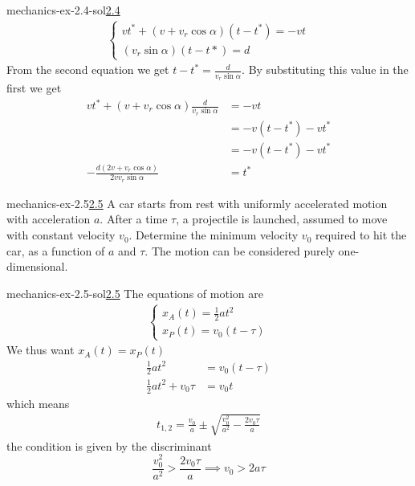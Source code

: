 \documentclass[preview]{standalone}
\begin{document}
\begin{snippetsolution}{mechanics-ex-2.4-sol}{\underline{2.4}}
\begin{align*}
\begin{cases}
            vt^* + (v+v_r \cos \alpha)(t-t^*) = -vt \\
            (v_r \sin \alpha)(t-t*) = d
        \end{cases}
    \end{align*}
    From the second equation we get \(t-t^* = \frac{d}{v_r \sin \alpha}\).
    By substituting this value in the first we get
    \begin{align*}
        vt^* + (v + v_r \cos\alpha) \frac{d}{v_r \sin\alpha} &= -vt \\
         &= -v(t-t^*) - vt^* \\
         &= -v(t-t^*) - vt^* \\
         -\frac{d(2v + v_r\cos\alpha)}{2vv_r\sin\alpha} &= t^*
    \end{align*}
\end{snippetsolution}

\begin{snippetexercise}{mechanics-ex-2.5}{\underline{2.5}}
    A car starts from rest with uniformly accelerated motion with acceleration \(a\).
    After a time \(\tau\), a projectile is launched, assumed to move with constant velocity \(v_0\).
    Determine the minimum velocity \(v_0\) required to hit the car, as a function of \(a\) and \(\tau\).
    The motion can be considered purely one-dimensional.
\end{snippetexercise}

\begin{snippetsolution}{mechanics-ex-2.5-sol}{\underline{2.5}}
    The equations of motion are
    \begin{align*}
        \begin{cases}
            x_A(t) = \frac{1}{2}at^2 \\
            x_P(t) = v_0(t-\tau)
        \end{cases}
    \end{align*}
    We thus want \(x_A(t) = x_P(t)\)
    \begin{align*}
        \frac{1}{2}at^2 &= v_0(t-\tau) \\
        \frac{1}{2}at^2 + v_0\tau &= v_0t
    \end{align*}
    which means
    \begin{align*}
        t_{1,2} = \frac{v_0}{a} \pm \sqrt{\frac{v_0^2}{a^2} - \frac{2v_0\tau}{a}}
    \end{align*}
    the condition is given by the discriminant
    \[
        \frac{v_0^2}{a^2} > \frac{2v_0\tau}{a}
        \implies
        v_0 > 2a\tau
    \]
\end{snippetsolution}
\end{document}
